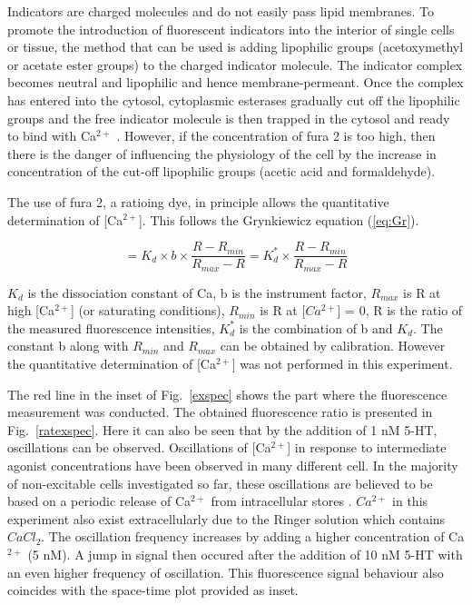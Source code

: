 Indicators are charged molecules and do not easily pass lipid membranes. 
To promote the introduction of fluorescent indicators into the interior of single cells or tissue, the method that can be used is adding lipophilic groups (acetoxymethyl or acetate ester groups) to the charged indicator molecule. 
The indicator complex becomes neutral and lipophilic and hence membrane-permeant. 
Once the complex has entered into the cytosol, cytoplasmic esterases gradually cut off the lipophilic groups and the free indicator molecule is then trapped in the cytosol and ready to bind with Ca$^{2+}$ \cite{Islam2012}. 
However, if the concentration of fura 2 is too high, then there is the danger of influencing the physiology of the cell by the increase in concentration of the cut-off lipophilic groups (acetic acid and formaldehyde).

The use of fura 2, a ratioing dye, in principle allows the quantitative determination of [Ca$^{2+}$]. 
This follows the Grynkiewicz equation (\ref{eq:Gr}).

\begin{equation}
 [Ca^{2+}] = K_{d} \times b \times \frac{R-R_{min}}{R_{max}-R} = K_{d}^{*} \times \frac{R-R_{min}}{R_{max}-R}\label{eq:Gr}
\end{equation}

$K_{d}$ is the dissociation constant of Ca, b is the instrument factor, $R_{max}$ is R at high [Ca$^{2+}$] (or saturating conditions), $R_{min}$ is R at [$Ca^{2+}$] = 0, R is the ratio of the measured fluorescence intensities, $K_{d}^{*}$ is the combination of b and $K_{d}$. 
The constant b along with $R_{min}$ and $R_{max}$ can be obtained by calibration. 
However the quantitative determination of [Ca$^{2+}$] was not performed in this experiment.

The red line in the inset of Fig.~\ref{exspec} shows the part where the fluorescence measurement was conducted. 
The obtained fluorescence ratio is presented in Fig.~\ref{ratexspec}. 
Here it can also be seen that by the addition of 1 nM 5-HT, oscillations can be observed. Oscillations of [Ca$^{2+}$] in response to intermediate agonist concentrations have been observed in many different cell. In the majority of non-excitable cells investigated so far, these oscillations are believed to be based on a periodic release of Ca$^{2+}$ from intracellular stores \cite{Zimmermann1997}. 
$Ca^{2+}$ in this experiment also exist extracellularly due to the Ringer solution which contains $CaCl_2$. 
The oscillation frequency increases by adding a higher concentration of Ca$^{2+}$ (5 nM). 
A jump in signal then occured after the addition of 10 nM 5-HT with an even higher frequency of oscillation. This fluorescence signal behaviour also coincides with the space-time plot provided as inset.

